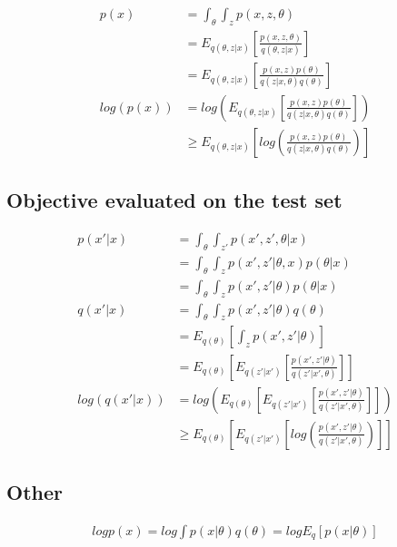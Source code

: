 \documentclass{article}
\begin{document}
\begin{align}
    p(x) &= \int_{\theta} \int_{z} p(x,z,\theta) \\
    &= E_{q(\theta,z|x)} \left[ \frac{p(x,z,\theta)}{q(\theta,z|x)} \right ] \\
    &= E_{q(\theta,z|x)} \left[ \frac{p(x,z)p(\theta)}{q(z|x,\theta)q(\theta)} \right ] \\
    log(p(x)) &= log \left( E_{q(\theta,z|x)} \left[ \frac{p(x,z)p(\theta)}{q(z|x,\theta)q(\theta)} \right ] \right) \\
    &\geq  E_{q(\theta,z|x)} \left[ log \left( \frac{p(x,z)p(\theta)}{q(z|x,\theta)q(\theta)} \right) \right ] 
\end{align}


\subsection{Objective evaluated on the test set}


\begin{align}
    p(x'|x) &= \int_{\theta} \int_{z'} p(x',z',\theta|x) \\
    &= \int_{\theta} \int_{z} p(x',z'|\theta,x) p(\theta|x) \\
    &= \int_{\theta} \int_{z} p(x',z'|\theta) p(\theta|x) \\
    q(x'|x) &= \int_{\theta} \int_{z} p(x',z'|\theta) q(\theta) \\
    &= E_{q(\theta)} \left[ \int_{z} p(x',z'|\theta) \right] \\
    &= E_{q(\theta)} \left[ E_{q(z'|x')} \left[ \frac{p(x',z'|\theta)}{q(z'|x',\theta)} \right] \right]  \\
	log(q(x'|x)) &= log \left(  E_{q(\theta)} \left[ E_{q(z'|x')} \left[ \frac{p(x',z'|\theta)}{q(z'|x',\theta)}  \right ] \right ] \right) \\
    &\geq   E_{q(\theta)} \left[ E_{q(z'|x')} \left[ log \left( \frac{p(x',z'|\theta)}{q(z'|x',\theta)} \right) \right ] \right ] 
\end{align}



\subsection{Other}


\begin{align}
    log p(x) = log \int p(x|\theta) q(\theta) = log E_q \left[ p(x|\theta) \right]
\end{align}
\end{document}
